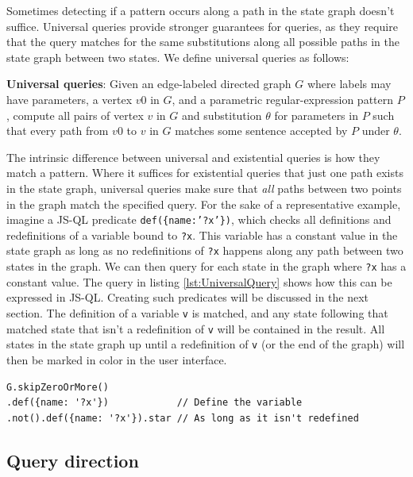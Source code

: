 Sometimes detecting if a pattern occurs along a path in the state graph doesn't suffice. Universal queries provide stronger guarantees for queries, as they require that the query matches for the same substitutions along all possible paths in the state graph between two states. We define universal queries as follows:
\begin{definition}
\textbf{Universal queries}: Given an edge-labeled directed graph $G$ where labels may have parameters, a vertex $v0$ in $G$, and a parametric regular-expression pattern $P$, compute all pairs of vertex $v$ in $G$ and substitution $\theta$ for parameters in $P$ such that every path from $v0$ to $v$ in $G$ matches some sentence accepted by $P$ under $\theta$.
\end{definition}

The intrinsic difference between universal and existential queries is how they match a pattern. Where it suffices for existential queries that just one path exists in the state graph, universal queries make sure that \textit{all} paths between two points in the graph match the specified query. For the sake of a representative example, imagine a JS-QL predicate \texttt{def(\{name:'?x'\})}, which checks all definitions and redefinitions of a variable bound to \texttt{?x}. This variable has a constant value in the state graph as long as no redefinitions of \texttt{?x} happens along any path between two states in the graph. We can then query for each state in the graph where \texttt{?x} has a constant value. The query in listing \ref{lst:UniversalQuery} shows how this can be expressed in JS-QL. Creating such predicates will be discussed in the next section. The definition of a variable \texttt{v} is matched, and any state following that matched state that isn't a redefinition of \texttt{v} will be contained in the result. All states in the state graph up until a redefinition of \texttt{v} (or the end of the graph) will then be marked in color in the user interface.

\begin{lstlisting}[label={lst:UniversalQuery},language=JSQL, caption=Checking for constant folding using a universal query,mathescape=true]
G.skipZeroOrMore()
.def({name: '?x'})            // Define the variable
.not().def({name: '?x'}).star // As long as it isn't redefined
\end{lstlisting}

\subsection{Query direction}

